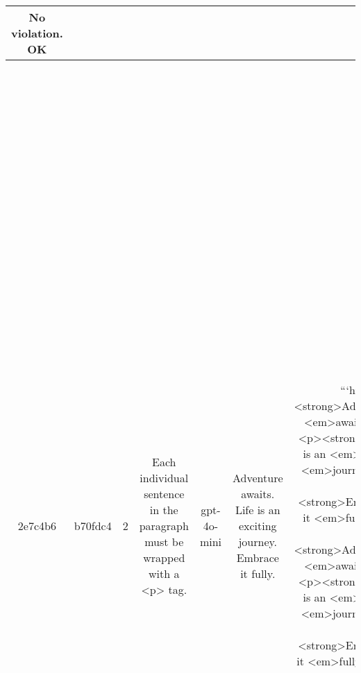 \begin{table}[h!]
\begin{tabular}{|c|c|c|c|c|c|c|c|c|c|}
No violation.
OK & \\
\hline
2e7c4b6 & b70fdc4 & 2 & Each individual sentence in the paragraph must be wrapped with a <p> tag. & gpt-4o-mini & Adventure awaits. Life is an exciting journey. Embrace it fully. & ```html
<p><strong>Adventure</strong> <em>awaits</em>.</p>
<p><strong>Life</strong> is an <em>exciting</em> <em>journey</em>.</p>
<p><strong>Embrace</strong> it <em>fully</em>.</p>
<p><strong>Adventure</strong> <em>awaits</em>.</p>
<p><strong>Life</strong> is an <em>exciting</em> <em>journey</em>.</p>
<p><strong>Embrace</strong> it <em>fully</em>.</p>
``` & ok & The chatbot output contains six <p> tags, each encapsulating a sentence as required. It is specified to have at least three <p> tags, which this output complies with. Each <p> tag also includes at least one <strong> tag to emphasize key words and multiple <em> tags for other relevant words or phrases, satisfying that part of the requirement as well. There does not appear to be any explicit violations regarding the splitting of sentences, tagging methods, or the minimum tag requirements. Thus, the output correctly follows the guidelines laid out in the description.

No violation.
OK & \\
\hline
a7b5adb & b70fdc4 & 3 & There should be at least three <p> tags in the output. & gpt-4o-mini & History teaches us valuable lessons. The present is a gift. Future is unknown. & ```html
<p><strong>History</strong> teaches us <em>valuable</em> <em>lessons</em>.</p>
<p>The <strong>present</strong> is a <em>gift</em>.</p>
<p>The <strong>future</strong> is <em>unknown</em>.</p>
``` & ok & The chatbot's output should be evaluated based on the requirements set by the description. Let's examine the given output:

1. The output has been divided into individual sentences, and each sentence is wrapped in a `<p>` tag. This complies with the guideline.
2. The output contains exactly three `<p>` tags, which meets the requirement of having at least three `<p>` tags.
3. Each `<p>` tag contains at least one `<strong>` tag, which is also necessary as per the description.
4. There are `<em>` tags present within each `<p>` tag for emphasizing words or phrases, fulfilling the requirement for adding multiple `<em>` tags.

Based on these observations, the chatbot's output matches the guidelines provided in the description. No part of the evaluation depends on knowing the input, and all the explicit requirements have been met.


\end{tabular}
\end{table}
